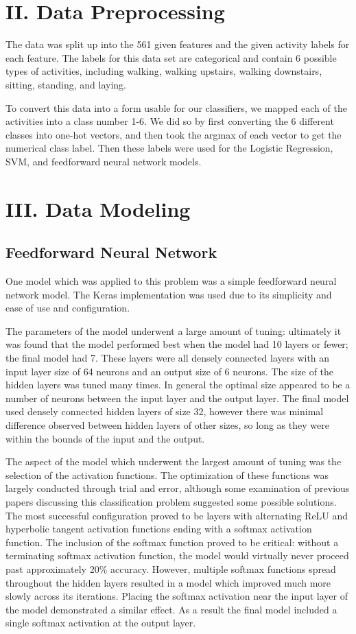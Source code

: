 \documentclass[12pt]{article}
\begin{document}
\section*{II. Data Preprocessing}
 	The data was split up into the 561 given features and the given activity labels for each feature. The labels for this data set are categorical and contain 6 possible types of activities, including walking, walking upstairs, walking downstairs, sitting, standing, and laying. 
 	
   \newline \newline To convert this data into a form usable for our classifiers, we mapped each of the activities into a class number 1-6. We did so by first converting the 6 different classes into one-hot vectors, and then took the argmax of each vector to get the numerical class label. Then these labels were used for the Logistic Regression, SVM, and feedforward neural network models.
   
\section*{III. Data Modeling}
\subsection*{Feedforward Neural Network}
One model which was applied to this problem was a simple feedforward neural network model. The Keras implementation was used due to its simplicity and ease of use and configuration.

The parameters of the model underwent a large amount of tuning: ultimately it was found that the model performed best when the model had 10 layers or fewer; the final model had 7. These layers were all densely connected layers with an input layer size of 64 neurons and an output size of 6 neurons. The size of the hidden layers was tuned many times. In general the optimal size appeared to be a number of neurons between the input layer and the output layer. The final model used densely connected hidden layers of size 32, however there was minimal difference observed between hidden layers of other sizes, so long as they were within the bounds of the input and the output.

The aspect of the model which underwent the largest amount of tuning was the selection of the activation functions. The optimization of these functions was largely conducted through trial and error, although some examination of previous papers discussing this classification problem suggested some possible solutions. The most successful configuration proved to be layers with alternating ReLU and hyperbolic tangent activation functions ending with a softmax activation function. The inclusion of the softmax function proved to be critical: without a terminating softmax activation function, the model would virtually never proceed past approximately 20\% accuracy. However, multiple softmax functions spread throughout the hidden layers resulted in a model which improved much more slowly across its iterations. Placing the softmax activation near the input layer of the model demonstrated a similar effect. As a result the final model included a single softmax activation at the output layer.
\end{document}
